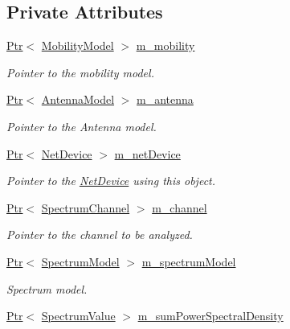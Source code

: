 \subsection*{Private Attributes}
\begin{DoxyCompactItemize}
\item 
\hyperlink{classns3_1_1Ptr}{Ptr}$<$ \hyperlink{classns3_1_1MobilityModel}{Mobility\+Model} $>$ \hyperlink{classns3_1_1SpectrumAnalyzer_ae74919a6bbdb2396127ac4729e89dfbb}{m\+\_\+mobility}
\begin{DoxyCompactList}\small\item\em Pointer to the mobility model. \end{DoxyCompactList}\item 
\hyperlink{classns3_1_1Ptr}{Ptr}$<$ \hyperlink{classns3_1_1AntennaModel}{Antenna\+Model} $>$ \hyperlink{classns3_1_1SpectrumAnalyzer_a5f7f5c7405004b22d6b0ba8c68a69dd6}{m\+\_\+antenna}
\begin{DoxyCompactList}\small\item\em Pointer to the Antenna model. \end{DoxyCompactList}\item 
\hyperlink{classns3_1_1Ptr}{Ptr}$<$ \hyperlink{classns3_1_1NetDevice}{Net\+Device} $>$ \hyperlink{classns3_1_1SpectrumAnalyzer_afdc437a3c7dec8e0a64b3e77ba199938}{m\+\_\+net\+Device}
\begin{DoxyCompactList}\small\item\em Pointer to the \hyperlink{classns3_1_1NetDevice}{Net\+Device} using this object. \end{DoxyCompactList}\item 
\hyperlink{classns3_1_1Ptr}{Ptr}$<$ \hyperlink{classns3_1_1SpectrumChannel}{Spectrum\+Channel} $>$ \hyperlink{classns3_1_1SpectrumAnalyzer_a479bd87363c1b8e85d5a24245a20d59e}{m\+\_\+channel}
\begin{DoxyCompactList}\small\item\em Pointer to the channel to be analyzed. \end{DoxyCompactList}\item 
\hyperlink{classns3_1_1Ptr}{Ptr}$<$ \hyperlink{classns3_1_1SpectrumModel}{Spectrum\+Model} $>$ \hyperlink{classns3_1_1SpectrumAnalyzer_a78314e27bf7ac8c346b36882aa688cb2}{m\+\_\+spectrum\+Model}
\begin{DoxyCompactList}\small\item\em Spectrum model. \end{DoxyCompactList}\item 
\hyperlink{classns3_1_1Ptr}{Ptr}$<$ \hyperlink{classns3_1_1SpectrumValue}{Spectrum\+Value} $>$ \hyperlink{classns3_1_1SpectrumAnalyzer_a8afa70cbc19bcd5a1fe2567eecc826d7}{m\+\_\+sum\+Power\+Spectral\+Density}

\end{DoxyCompactItemize}
